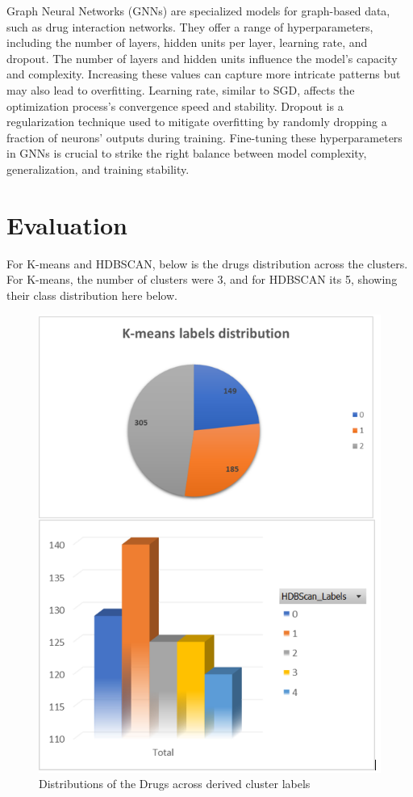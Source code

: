 \documentclass[journal,transmag]{J-NaNA}
\begin{document}
Graph Neural Networks (GNNs) are specialized models for graph-based data, such as drug interaction networks. They offer a range of hyperparameters, including the number of layers, hidden units per layer, learning rate, and dropout. The number of layers and hidden units influence the model's capacity and complexity. Increasing these values can capture more intricate patterns but may also lead to overfitting. Learning rate, similar to SGD, affects the optimization process's convergence speed and stability. Dropout is a regularization technique used to mitigate overfitting by randomly dropping a fraction of neurons' outputs during training. Fine-tuning these hyperparameters in GNNs is crucial to strike the right balance between model complexity, generalization, and training stability.

\section{Evaluation}
For K-means and HDBSCAN, below is the drugs distribution across the clusters. For K-means, the number of clusters were 3, and for HDBSCAN its 5, showing their class distribution here below.

\begin{figure}[htbp]
\centering
\includegraphics[width=\linewidth]{cluster_results.PNG} 
\caption{Distributions of the Drugs across derived cluster labels} 
\label{fig: Performance Metrics} %
\end{figure}
\end{document}
